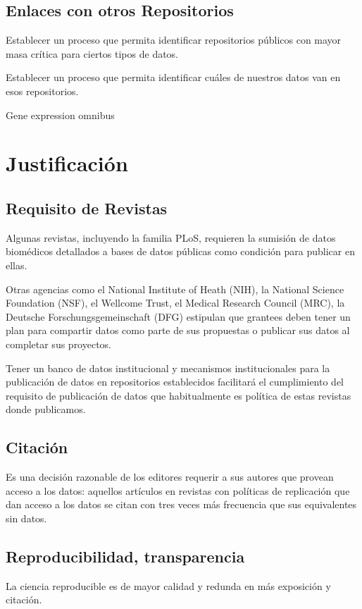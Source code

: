 \documentclass[
10pt, %
letterpaper, %
oneside, %
headinclude,footinclude, %
BCOR5mm, %
]{scrartcl}
\begin{document}
\subsection{Enlaces con otros Repositorios}
Establecer un proceso que permita identificar repositorios públicos
con mayor masa crítica para ciertos tipos de datos.

Establecer un proceso que permita identificar cuáles de nuestros datos
van en esos repositorios.
\cite{_genebank_????}
\cite{king_introduction_2007}

Gene expression omnibus

\section{Justificación}


\subsection{Requisito de Revistas}

Algunas revistas, incluyendo la familia PLoS, requieren la sumisión de
datos biomédicos detallados a bases de datos públicas como condición
para publicar en ellas.\cite{piwowar_sharing_2007, hrynaszkiewicz}

Otras agencias como el National Institute of Heath (NIH), la National
Science Foundation (NSF), el Wellcome Trust, el Medical Research
Council (MRC), la Deutsche Forschungsgemeinschaft (DFG) estipulan que
grantees deben tener un plan para compartir datos como parte de sus
propuestas o publicar sus datos al completar sus
proyectos.\cite{wicherts_publish_2012}

Tener un banco de datos institucional y mecanismos institucionales
para la publicación de datos en repositorios establecidos facilitará
el cumplimiento del requisito de publicación de datos que
habitualmente es política de estas revistas donde publicamos.


\subsection{Citación}
Es una decisión razonable de los editores requerir a sus autores
que provean acceso a los datos: aquellos artículos en revistas con
políticas de replicación que dan acceso a los datos se citan con tres
veces más frecuencia que sus equivalentes sin datos.\cite{walport_sharing_2011}


\subsection{Reproducibilidad, transparencia}
La ciencia reproducible es de mayor calidad y redunda en más exposición y
citación. \cite{piwowar_sharing_2007, ioannidis_improving_2011}
\end{document}
